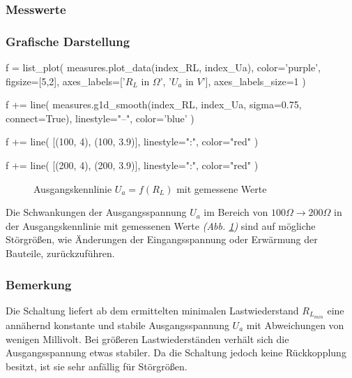 \documentclass[a4paper]{hitec}
\begin{document}
\subsubsection{Messwerte}

\begin{center}
    \renewcommand{\arraystretch}{1.2}
\end{center}

\subsubsection{Grafische Darstellung}

\begin{sagesilent}
    f = list_plot(
        measures.plot_data(index_RL, index_Ua),
        color='purple',
        figsize=[5,2],
        axes_labels=['$R_L$ in $\Omega$', '$U_a$ in $V$'],
        axes_labels_size=1
    )

    f += line(
        measures.g1d_smooth(index_RL, index_Ua, sigma=0.75, connect=True),
        linestyle="--",
        color='blue'
    )

    f += line(
        [(100, 4), (100, 3.9)],
        linestyle=":",
        color="red"
    )

    f += line(
        [(200, 4), (200, 3.9)],
        linestyle=":",
        color="red"
    )
\end{sagesilent}

\begin{figure}[H]
    \centering
    \caption{Ausgangskennlinie \textbf{$U_{a} = f(R_L)$} mit gemessene Werte}
    \label{fig:measure1}
\end{figure}

Die Schwankungen der Ausgangsspannung $U_{a}$ im Bereich von $100\Omega \to 200\Omega$ in der Ausgangskennlinie mit gemessenen Werte \textit{(Abb. \ref{fig:measure1})} sind auf mögliche Störgrößen, wie Änderungen der Eingangsspannung oder Erwärmung der Bauteile, zurückzuführen.

\subsubsection{Bemerkung}

Die Schaltung liefert ab dem ermittelten minimalen Lastwiederstand $R_{L_{min}}$ eine annähernd konstante und stabile Ausgangsspannung $U_{a}$ mit Abweichungen von wenigen Millivolt.
Bei größeren Lastwiederständen verhält sich die Ausgangsspannung etwas stabiler.
Da die Schaltung jedoch keine Rückkopplung besitzt, ist sie sehr anfällig für Störgrößen.
\end{document}
